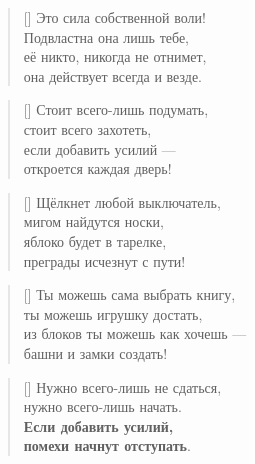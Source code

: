 \documentclass[a5paper,11pt]{memoir}
\begin{document}
\begin{verse}[\versewidth]
\hspace{1.2cm}Это сила собственной воли! \\
\hspace{1.1cm}Подвластна она лишь тебе, \\
\hspace{1cm}её никто, никогда не отнимет, \\
\hspace{0.9cm}она действует всегда и везде.
\end{verse}

\begin{verse}[\versewidth]
\hspace{0.7cm}Стоит всего-лишь подумать, \\
\hspace{0.6cm}стоит всего захотеть, \\
\hspace{0.5cm}если добавить усилий --- \\ 
\hspace{0.4cm}откроется каждая дверь!
\end{verse}

\begin{verse}[\versewidth]
\hspace{0.5cm}Щёлкнет любой выключатель, \\
\hspace{0.45cm}мигом найдутся носки, \\
\hspace{0.4cm}яблоко будет в тарелке, \\
\hspace{0.3cm}преграды исчезнут с пути!
\end{verse}

\begin{verse}[\versewidth]
\hspace{0.5cm}Ты можешь сама выбрать книгу, \\
\hspace{0.45cm}ты можешь игрушку достать, \\
\hspace{0.4cm}из блоков ты можешь как хочешь --- \\
\hspace{0.3cm}башни и замки создать!
\end{verse}


\begin{verse}[\versewidth]
Нужно всего-лишь не сдаться, \\
нужно всего-лишь начать. \\
\textbf{Если добавить усилий, \\
\hspace{-0.3cm}помехи начнут отступать}.
\end{verse}
\end{document}
